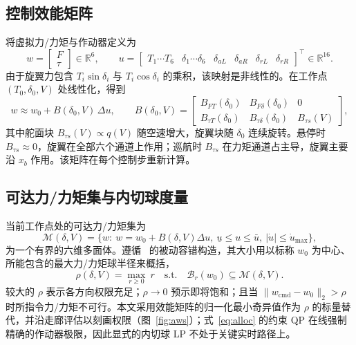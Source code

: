 \documentclass[UTF8,a4paper,11pt]{ctexart}
\begin{document}
\subsection{控制效能矩阵}\label{sec:Bmatrix}
将虚拟力/力矩与作动器定义为
\begin{equation}
w=\begin{bmatrix}F\\ \tau\end{bmatrix}\in\mathbb{R}^{6},\qquad
u=\begin{bmatrix}T_1\!\cdots T_6&\delta_1\!\cdots\delta_6&\delta_{aL}&\delta_{aR}&\delta_{rL}&\delta_{rR}\end{bmatrix}^\top\in\mathbb{R}^{16}.
\label{eq:wu}
\end{equation}
由于旋翼力包含 $T_i\sin\delta_i$ 与 $T_i\cos\delta_i$ 的乘积，该映射是非线性的。在工作点 $(T_0,\delta_0,V)$ 处线性化，得到
\begin{equation}
w \approx w_0 + B(\delta_0,V)\,\Delta u,\qquad
B(\delta_0,V)=\begin{bmatrix}
B_{FT}(\delta_0) & B_{F\delta}(\delta_0) & 0\\
B_{\tau T}(\delta_0) & B_{\tau\delta}(\delta_0) & B_{\tau s}(V)
\end{bmatrix},
\label{eq:B}
\end{equation}
其中舵面块 $B_{\tau s}(V)\propto q(V)$ 随空速增大，旋翼块随 $\delta_0$ 连续旋转。悬停时 $B_{\tau s}\approx0$，旋翼在全部六个通道上作用；巡航时 $B_{\tau s}$ 在力矩通道占主导，旋翼主要沿 $x_b$ 作用。该矩阵在每个控制步重新计算。

\subsection{可达力/力矩集与内切球度量}\label{sec:awsmetric}
当前工作点处的可达力/力矩集为
\begin{equation}
\mathcal{M}(\delta,V)=\bigl\{w:\ w=w_0+B(\delta,V)\Delta u,\
\underline u\le u\le\bar u,\ |\dot u|\le\dot u_{\max}\bigr\},
\label{eq:AWS}
\end{equation}
为一个有界的六维多面体。遵循~\cite{yang2026biaxial} 的被动容错构造，其大小用以标称 $w_0$ 为中心、所能包含的最大力/力矩球半径来概括，
\begin{equation}
\rho(\delta,V)=\max_{r\ge0}\ r\quad\text{s.t.}\quad
\mathcal{B}_r(w_0)\subseteq\mathcal{M}(\delta,V).
\label{eq:rho}
\end{equation}
较大的 $\rho$ 表示各方向权限充足；$\rho\to0$ 预示即将饱和；且当 $\|w_{\mathrm{cmd}}-w_0\|_2>\rho$ 时所指令力/力矩不可行。本文采用效能矩阵的归一化最小奇异值作为 $\rho$ 的标量替代，并沿走廊评估以刻画权限（图~\ref{fig:aws}）；式~\eqref{eq:alloc} 的约束 QP 在线强制精确的作动器极限，因此显式的内切球 LP 不处于关键实时路径上。
\end{document}
